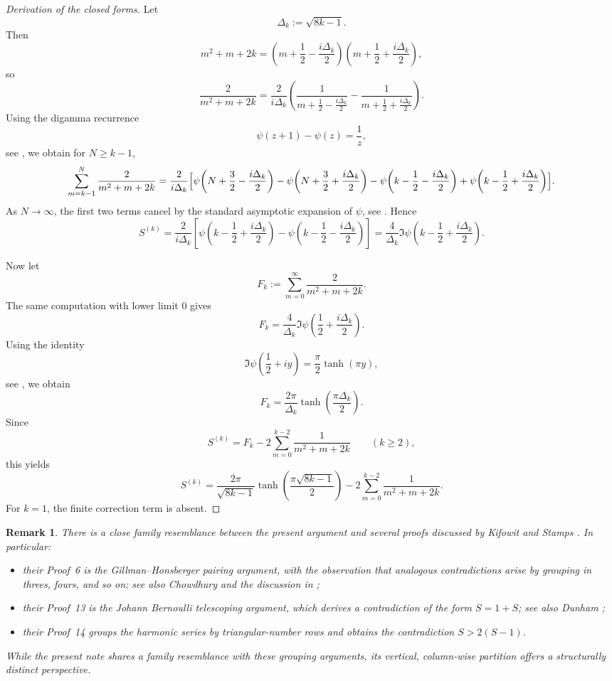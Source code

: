 \documentclass[11pt]{article}
\newtheorem{remark}{Remark}
\begin{document}
\begin{proof}[Derivation of the closed forms]
Let
\[
\Delta_k:=\sqrt{8k-1}.
\]
Then
\[
m^2+m+2k
=
\left(m+\frac12-\frac{i\Delta_k}{2}\right)
\left(m+\frac12+\frac{i\Delta_k}{2}\right),
\]
so
\[
\frac{2}{m^2+m+2k}
=
\frac{2}{i\Delta_k}
\left(
\frac{1}{m+\frac12-\frac{i\Delta_k}{2}}
-
\frac{1}{m+\frac12+\frac{i\Delta_k}{2}}
\right).
\]
Using the digamma recurrence
\[
\psi(z+1)-\psi(z)=\frac1z,
\]
see \cite[\href{https://dlmf.nist.gov/5.5.E2}{(5.5.2)}]{NIST:DLMF}, we obtain for \(N\ge k-1\),
\[
\sum_{m=k-1}^{N}\frac{2}{m^2+m+2k}
=
\frac{2}{i\Delta_k}
\Bigl[
\psi\!\left(N+\frac32-\frac{i\Delta_k}{2}\right)
-\psi\!\left(N+\frac32+\frac{i\Delta_k}{2}\right)
-\psi\!\left(k-\frac12-\frac{i\Delta_k}{2}\right)
+\psi\!\left(k-\frac12+\frac{i\Delta_k}{2}\right)
\Bigr].
\]
As \(N\to\infty\), the first two terms cancel by the standard asymptotic expansion of
\(\psi\), see \cite[\href{https://dlmf.nist.gov/5.11.E2}{(5.11.2)}]{NIST:DLMF}. Hence
\[
S^{(k)}
=
\frac{2}{i\Delta_k}
\left[
\psi\!\left(k-\frac12+\frac{i\Delta_k}{2}\right)
-
\psi\!\left(k-\frac12-\frac{i\Delta_k}{2}\right)
\right]
=
\frac{4}{\Delta_k}
\Im \psi\!\left(k-\frac12+\frac{i\Delta_k}{2}\right).
\]

Now let
\[
F_k:=\sum_{m=0}^{\infty}\frac{2}{m^2+m+2k}.
\]
The same computation with lower limit \(0\) gives
\[
F_k=\frac{4}{\Delta_k}\Im\psi\!\left(\frac12+\frac{i\Delta_k}{2}\right).
\]
Using the identity
\[
\Im\psi\!\left(\frac12+iy\right)=\frac{\pi}{2}\tanh(\pi y),
\]
see \cite[\href{https://dlmf.nist.gov/5.4.E17}{(5.4.17)}]{NIST:DLMF}, we obtain
\[
F_k
=
\frac{2\pi}{\Delta_k}\tanh\!\left(\frac{\pi\Delta_k}{2}\right).
\]
Since
\[
S^{(k)}=
F_k-2\sum_{m=0}^{k-2}\frac{1}{m^2+m+2k}
\qquad (k\ge 2),
\]
this yields
\[
S^{(k)}
=
\frac{2\pi}{\sqrt{8k-1}}
\tanh\!\left(\frac{\pi\sqrt{8k-1}}{2}\right)
-
2\sum_{m=0}^{k-2}\frac{1}{m^2+m+2k}.
\]
For \(k=1\), the finite correction term is absent.
\end{proof}

\begin{remark}
There is a close family resemblance between the present argument and several proofs discussed by Kifowit and Stamps \cite{KifowitStamps2006}. In particular:
\begin{itemize}
    \item their Proof~6 is the Gillman--Honsberger pairing argument, with the observation that analogous contradictions arise by grouping in threes, fours, and so on; see also Chowdhury \cite{Chowdhury1975} and the discussion in \cite{Kifowit2019};
    \item their Proof~13 is the Johann Bernoulli telescoping argument, which derives a contradiction of the form \(S = 1 + S\); see also Dunham \cite{Dunham1987};
    \item their Proof~14 groups the harmonic series by triangular-number rows and obtains the contradiction \(S > 2(S-1)\).
\end{itemize}
While the present note shares a family resemblance with these grouping arguments, its vertical, column-wise partition offers a structurally distinct perspective.
\end{remark}
\end{document}
